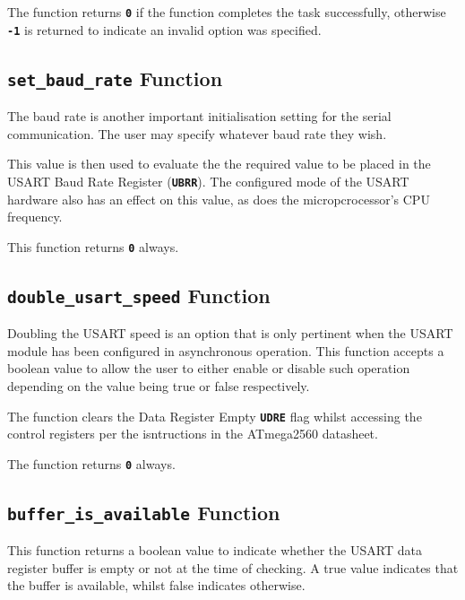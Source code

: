 \documentclass[a4paper, oneside, 11pt, titlepage, onecolumn, openright]{report}
\begin{document}
{{			The function returns \textbf{\texttt{0}} if the function completes the task successfully, otherwise \textbf{\texttt{-1}} is returned to indicate an invalid option was specified.
			
\subsection{\textbf{\texttt{set\_baud\_rate}} Function}
			\label{ss:HALusartset_baud_rateFunction}
			
			The baud rate is another important initialisation setting for the serial communication. The user may specify whatever baud rate they wish.
			
			This value is then used to evaluate the the required value to be placed in the USART Baud Rate Register (\textbf{\texttt{UBRR}}). The configured mode of the USART hardware also has an effect on this value, as does the micropcrocessor's CPU frequency. 
			
			This function returns \textbf{\texttt{0}} always.

\subsection{\textbf{\texttt{double\_usart\_speed}} Function}
			\label{ss:HALusartdouble_usart_speedFunction}
			
			Doubling the USART speed is an option that is only pertinent when the USART module has been configured in asynchronous operation. This function accepts a boolean value to allow the user to either enable or disable such operation depending on the value being true or false respectively.
			
			The function clears the Data Register Empty \textbf{\texttt{UDRE}} flag whilst accessing the control registers per the isntructions in the ATmega2560 datasheet.
			
			The function returns \textbf{\texttt{0}} always.

\subsection{\textbf{\texttt{buffer\_is\_available}} Function}
			\label{ss:HALusartbuffer_is_availableFunction}
			
			This function returns a boolean value to indicate whether the USART data register buffer is empty or not at the time of checking. A true value indicates that the buffer is available, whilst false indicates otherwise.
			
}}
\end{document}
